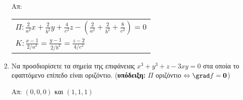 \begin{enumerate}
    \hfill Απ: \begin{tabular}{l}
      $ \Pi : \frac{2}{a^{2}} x+ \frac{2}{b^{2}} y+ \frac{4}{c^{2}} z- 
      \left(\frac{2}{a^{2}}+ \frac{2}{b^{2}}+ \frac{8}{c^{2}}\right) = 0 $ \\
      $ K : \frac{x-1}{2/a^{2}} = \frac{y-1}{2/b^{2}} = \frac{z-2}{4/c^{2}} $
    \end{tabular} 

  \item Να προσδιορίσετε τα σημεία της επιφάνειας $ x^{3}+y^{3}+z-3xy=0 $ στα οποία 
    το εφαπτόμενο επίπεδο είναι οριζόντιο.
    \hfill (\textbf{υπόδειξη:} $\Pi$ οριζόντιο $ \Leftrightarrow \grad f = \mathbf{0} $)

    \hfill Απ: $ (0,0,0) $ και $ (1,1,1) $ 
\end{enumerate}


